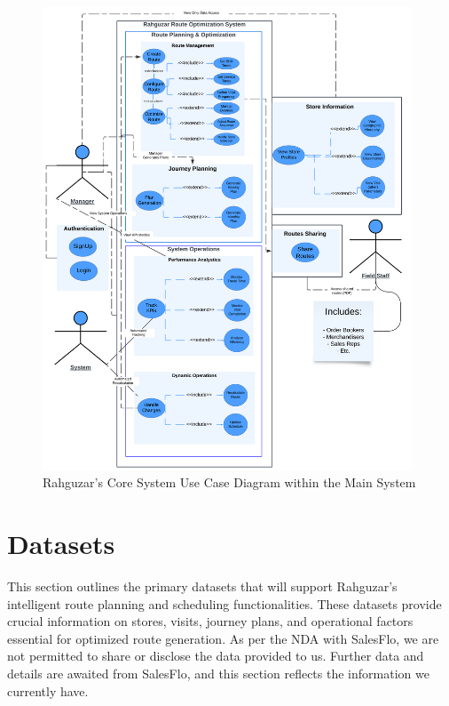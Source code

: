 \begin{center}
    \begin{figure}[H]
        \centering
        \includegraphics[width=0.98\textwidth]{images/Rahguzar - Use Case - Core System.png} 
        \caption{Rahguzar's Core System Use Case Diagram within the Main System}
    \end{figure}
\end{center}

\section{Datasets}
This section outlines the primary datasets that will support Rahguzar’s intelligent route planning and scheduling functionalities. These datasets provide crucial information on stores, visits, journey plans, and operational factors essential for optimized route generation. As per the NDA with SalesFlo, we are not permitted to share or disclose the data provided to us. Further data and details are awaited from SalesFlo, and this section reflects the information we currently have.

